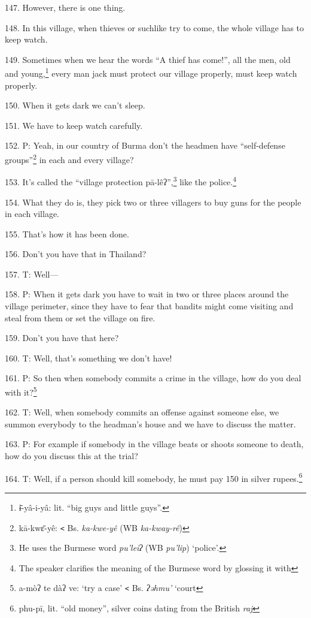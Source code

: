 147. However, there is one thing.

148. In this village, when thieves or suchlike try to come, the whole village has
to keep watch.

149. Sometimes when we hear the words ``A thief has come!'', all the men, old and
young,\footnote{ɨ̄-yâ-i-yâ: lit. ``big guys and little guys''.}  every man jack must protect our village properly, must keep watch properly.

150. When it gets dark we can't sleep.

151. We have to keep watch carefully.

152. P: Yeah, in our country of Burma don't the headmen have ``self-defense groups''\footnote{kā-kwɛ̄-yê: \texttt{<} Bs. \textit{ka-kwe-yê }(WB \textit{ka-kway-rê})}
in each and every village?

153. It's called the ``village protection pā-lêʔ'',\footnote{He uses the Burmese word \textit{pu'leiʔ }(WB \textit{pu'lip}) `police'.} like the police.\footnote{The speaker clarifies the meaning of the Burmese word by glossing it with}

154. What they do is, they pick two or three villagers to buy guns for the people
in each village.

155. That's how it has been done.

156. Don't you have that in Thailand?

157. T: Well---

158. P: When it gets dark you have to wait in two or three places around the village
perimeter, since they have to fear that bandits might come visiting and steal from
them or set the village on fire.

159. Don't you have that here?

160. T: Well, that's something we don't have!

161. P: So then when somebody commits a crime in the village, how do you deal with
it?\footnote{a-mòʔ te dàʔ ve: `try a case' \texttt{<} Bs. \textit{ʔəhmu' }`court}

162. T: Well, when somebody commits an offense against someone else, we summon
everybody to the headman's house and we have to discuss the matter.

163. P: For example if somebody in the village beats or shoots someone to death,
how do you discuss this at the trial?

164. T: Well, if a person should kill somebody, he must pay 150 in silver rupees.\footnote{phu-pī, lit. ``old money'', silver coins dating from the British \textit{raj}}

